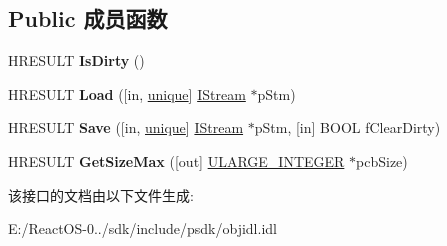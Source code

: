 \subsection*{Public 成员函数}
\begin{DoxyCompactItemize}
\item 
\mbox{\label{interface_i_persist_stream_aff664c9bffb0c6763b746270f1349536}} 
H\+R\+E\+S\+U\+LT {\bfseries Is\+Dirty} ()
\item 
\mbox{\label{interface_i_persist_stream_ac841b8b2fe3250b276cbade686bffa54}} 
H\+R\+E\+S\+U\+LT {\bfseries Load} (\mbox{[}in, \hyperlink{interfaceunique}{unique}\mbox{]} \hyperlink{interface_i_stream}{I\+Stream} $\ast$p\+Stm)
\item 
\mbox{\label{interface_i_persist_stream_a22a349e28afe8ae965d602defb7bc649}} 
H\+R\+E\+S\+U\+LT {\bfseries Save} (\mbox{[}in, \hyperlink{interfaceunique}{unique}\mbox{]} \hyperlink{interface_i_stream}{I\+Stream} $\ast$p\+Stm, \mbox{[}in\mbox{]} B\+O\+OL f\+Clear\+Dirty)
\item 
\mbox{\label{interface_i_persist_stream_a406de9b1cb22487919ee1b8f25dae599}} 
H\+R\+E\+S\+U\+LT {\bfseries Get\+Size\+Max} (\mbox{[}out\mbox{]} \hyperlink{struct___u_l_a_r_g_e___i_n_t_e_g_e_r}{U\+L\+A\+R\+G\+E\+\_\+\+I\+N\+T\+E\+G\+ER} $\ast$pcb\+Size)
\end{DoxyCompactItemize}


该接口的文档由以下文件生成\+:\begin{DoxyCompactItemize}
\item 
E\+:/\+React\+O\+S-\/0../sdk/include/psdk/objidl.\+idl\end{DoxyCompactItemize}
